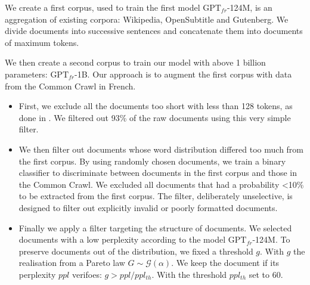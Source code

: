We create a first corpus, used to train the first model $\text{GPT}_{fr}$-124M, is an aggregation of existing corpora: Wikipedia, OpenSubtitle \parencite{tiedemann_12} and Gutenberg. We divide documents into successive sentences and concatenate them into documents of maximum  tokens.

We then create a second corpus to train our model with above 1 billion parameters: $\text{GPT}_{fr}$-1B. Our approach is to augment the first corpus with data from the Common Crawl in French. 
\begin{itemize}
    \item First, we exclude all the documents too short with less than 128 tokens, as done in \textcite{shoeybi_19}. We filtered out 93\% of the raw documents using this very simple filter. 
    \item We then filter out documents whose word distribution differed too much from the first corpus. By using  randomly chosen documents, we train a binary classifier to discriminate between documents in the first corpus and those in the Common Crawl. We excluded all documents that had a probability <10\% to be extracted from the first corpus. The filter, deliberately unselective, is designed to filter out explicitly invalid or poorly formatted documents.
    \item Finally we apply a filter targeting the structure of documents. We selected documents with a low perplexity according to the model $\text{GPT}_{fr}$-124M. To preserve documents out of the distribution, we fixed a threshold $g$. With $g$ the realisation from a Pareto law $G \sim \mathcal{G}(\alpha)$. We keep the document if its perplexity $ppl$ verifoes: $g > ppl / ppl_{th}$. With the threshold $ppl_{th}$ set to $60$. 
\end{itemize}
